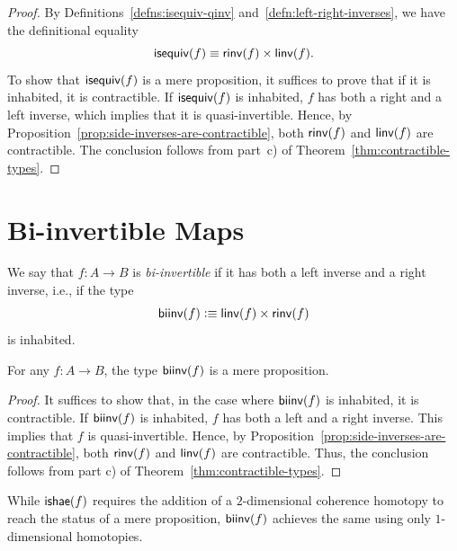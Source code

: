 \begin{proof}
    By Definitions~\ref{defns:isequiv-qinv} and~\ref{defn:left-right-inverses}, we have the definitional equality
    \[
    \mathsf{isequiv}(f)\equiv\mathsf{rinv}(f)\times\mathsf{linv}(f).
    \]
    To show that $\mathsf{isequiv}(f)$ is a mere proposition, it suffices to prove that if it is inhabited, it is contractible. If $\mathsf{isequiv}(f)$ is inhabited, $f$ has both a right and a left inverse, which implies that it is quasi-invertible. Hence, by Proposition~\ref{prop:side-inverses-are-contractible}, both $\mathsf{rinv}(f)$ and $\mathsf{linv}(f)$ are contractible. The conclusion follows from part~c) of Theorem~\ref{thm:contractible-types}.
\end{proof}

\section{Bi-invertible Maps}

\begin{defn}
    We say that $f\colon A\to B$ is \textsl{bi-invertible} if it has both a left inverse and a right inverse, i.e., if the type
    \[
        \mathsf{biinv}(f)\mathrel{\vcentcolon}\equiv\mathsf{linv}(f)\times\mathsf{rinv}(f)
    \]
    is inhabited.
\end{defn}

\begin{thm}\fe\label{thm:biinv-is-mere-proposition}
    For any\/ $f\colon A\to B$, the type\/ $\mathsf{biinv}(f)$ is a mere proposition.
\end{thm}

\begin{proof}
    It suffices to show that, in the case where $\mathsf{biinv}(f)$ is inhabited, it is contractible.
    If $\mathsf{biinv}(f)$ is inhabited, $f$ has both a left and a right inverse. This implies that $f$ is quasi-invertible.
    Hence, by Proposition~\ref{prop:side-inverses-are-contractible}, both $\mathsf{rinv}(f)$ and $\mathsf{linv}(f)$ are contractible.
    Thus, the conclusion follows from part c) of Theorem~\ref{thm:contractible-types}.
    
    
\end{proof}

\begin{rem}
    While\/ $\mathsf{ishae}(f)$ requires the addition of a $2$-dimensional coherence homotopy to reach the status of a mere proposition, $\mathsf{biinv}(f)$ achieves the same using only $1$-dimensional homotopies.
\end{rem}

